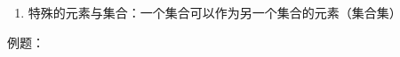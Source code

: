 \begin{enumerate}
\begin{enumerate}
            \item 文氏图（Venn图）：用平面上封闭曲线的内部代表集合
            \end{enumerate}
            列举法只适合有限集，并且常用来表示元素个数不多的有限集，例如列举法表示不了不等式$x-3 < 7$的解集。 \\ 
            描述法只能描述集合中元素具有共同特征的集合，例如描述法表示不了集合$\{1, \mbox{太阳}, \mbox{上海}\}$。\\
            区间对应的集合一定是实数集的子集。
        \item 特殊的元素与集合：一个集合可以作为另一个集合的元素（集合集）
            \begin{example}
            \end{example}
\end{enumerate} 
例题：
